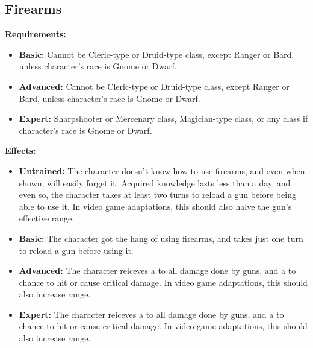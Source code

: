 \documentclass[openany,10pt,a4paper]{book}
\begin{document}
\subsection{Firearms}
\begin{table}[!ht]
\centering
{}
\end{table}
\textbf{Requirements:}
\begin{itemize}
	\item \textbf{Basic:} Cannot be Cleric-type or Druid-type class, except Ranger or Bard, unless character's race is Gnome or Dwarf.
	\item \textbf{Advanced:} Cannot be Cleric-type or Druid-type class, except Ranger or Bard, unless character's race is Gnome or Dwarf.
	\item \textbf{Expert:} Sharpshooter or Mercenary class, Magician-type class, or any class if character's race is Gnome or Dwarf.
\end{itemize}
\textbf{Effects:}
\begin{itemize}
	\item \textbf{Untrained:} The character doesn't know how to use firearms, and even when shown, will easily forget it. Acquired knowledge lasts less than a day, and even so, the character takes at least two turns to reload a gun before being able to use it. In video game adaptations, this should also halve the gun's effective range.
	\item \textbf{Basic:} The character got the hang of using firearms, and takes just one turn to reload a gun before using it. 
	\item \textbf{Advanced:} The character reiceves a  to all damage done by guns, and a  to chance to hit or cause critical damage. In video game adaptations, this should also increase range.
	\item \textbf{Expert:} The character reiceves a  to all damage done by guns, and a  to chance to hit or cause critical damage. In video game adaptations, this should also increase range.
\end{itemize}\newpage
\end{document}
